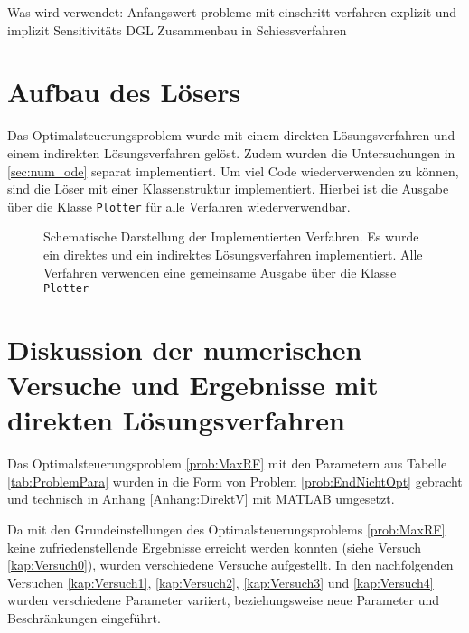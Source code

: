 Was wird verwendet:
Anfangswert probleme mit einschritt verfahren explizit und implizit
Sensitivitäts DGL
Zusammenbau in Schiessverfahren
















\section{Aufbau des Lösers}
Das Optimalsteuerungsproblem wurde mit einem direkten Lösungsverfahren und einem indirekten Lösungsverfahren gelöst. Zudem wurden die Untersuchungen in \autoref{sec:num_ode} separat implementiert. Um viel Code wiederverwenden zu können, sind die Löser mit einer Klassenstruktur implementiert. Hierbei ist die Ausgabe über die Klasse \verb+Plotter+ für alle Verfahren wiederverwendbar.

\begin{figure}
    \centering
    \caption{Schematische Darstellung der Implementierten Verfahren. Es wurde ein direktes und ein indirektes Lösungsverfahren implementiert. Alle Verfahren verwenden eine gemeinsame Ausgabe über die Klasse \verb+Plotter+}
\end{figure}















\section{Diskussion der numerischen Versuche und Ergebnisse mit direkten Lösungsverfahren}
Das Optimalsteuerungsproblem \ref{prob:MaxRF} mit den Parametern aus Tabelle \ref{tab:ProblemPara} wurden in die Form von Problem \ref{prob:EndNichtOpt} gebracht und technisch in Anhang \ref{Anhang:DirektV} mit MATLAB umgesetzt. 

Da mit den Grundeinstellungen des Optimalsteuerungsproblems \ref{prob:MaxRF} keine zufriedenstellende Ergebnisse erreicht werden konnten (siehe Versuch \ref{kap:Versuch0}), wurden verschiedene Versuche aufgestellt. In den nachfolgenden Versuchen \ref{kap:Versuch1}, \ref{kap:Versuch2}, \ref{kap:Versuch3} und \ref{kap:Versuch4} wurden verschiedene Parameter variiert, beziehungsweise neue Parameter und Beschränkungen eingeführt.

